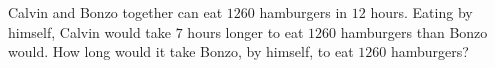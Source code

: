 Calvin and Bonzo together can eat $1260$ hamburgers in $12$ hours. Eating by himself, Calvin would take $7$ hours longer to eat $1260$ hamburgers than Bonzo would. How long would it take Bonzo, by himself, to eat $1260$ hamburgers?
